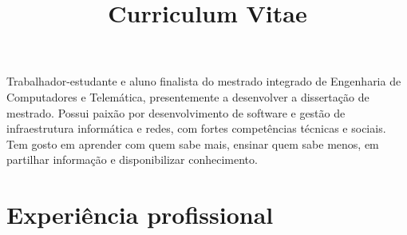 \documentclass[11pt,a4paper,sans]{moderncv} %
\title{Curriculum Vitae}                               %
\begin{document}
\makecvtitle

\small{Trabalhador-estudante e aluno finalista do mestrado integrado de
  Engenharia de Computadores e Telemática, presentemente a desenvolver a
  dissertação de mestrado. Possui paixão por desenvolvimento de software e
  gestão de infraestrutura informática e redes, com fortes competências técnicas
  e sociais. Tem gosto em aprender com quem sabe mais, ensinar quem sabe menos,
  em partilhar informação e disponibilizar conhecimento.}

\section{Experiência profissional}

\vspace{6pt}
\end{document}
